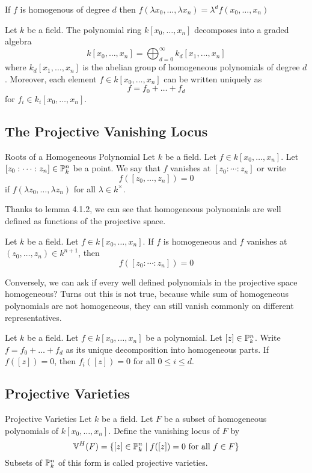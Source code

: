 \documentclass[a4paper]{article}
\begin{document}
\begin{lmm}{}{} If $f$ is homogenous of degree $d$ then $f(\lambda x_0,\dots,\lambda x_n)=\lambda^df(x_0,\dots,x_n)$
\end{lmm}

\begin{prp}{}{} Let $k$ be a field. The polynomial ring $k[x_0,\dots,x_n]$ decomposes into a graded algebra $$k[x_0,\dots,x_n]=\bigoplus_{d=0}^\infty k_d[x_1,\dots,x_n]$$ where $k_d[x_1,\dots,x_n]$ is the abelian group of homogeneous polynomials of degree $d$. Moreover, each element $f\in k[x_0,\dots,x_n]$ can be written uniquely as $$f=f_0+\dots+f_d$$ for $f_i\in k_i[x_0,\dots,x_n]$. 
\end{prp}

\subsection{The Projective Vanishing Locus}
\begin{defn}{Roots of a Homogeneous Polynomial}{} Let $k$ be a field. Let $f\in k[x_0,\dots,x_n]$. Let $[z_0:\cdots:z_n]\in\mathbb{P}_k^n$ be a point. We say that $f$ vanishes at $[z_0:\cdots:z_n]$ or write $$f([z_0,\dots,z_n])=0$$ if $f(\lambda z_0,\dots,\lambda z_n)$ for all $\lambda\in k^\times$. 
\end{defn}

Thanks to lemma 4.1.2, we can see that homogeneous polynomials are well defined as functions of the projective space. 

\begin{lmm}{}{} Let $k$ be a field. Let $f\in k[x_0,\dots,x_n]$. If $f$ is homogeneous and $f$ vanishes at $(z_0,\dots,z_n)\in k^{n+1}$, then $$f([z_0:\cdots:z_n])=0$$
\end{lmm}

Conversely, we can ask if every well defined polynomials in the projective space homogeneous? Turns out this is not true, because while sum of homogeneous polynomials are not homogeneous, they can still vanish commonly on different representatives. 

\begin{lmm}{}{} Let $k$ be a field. Let $f\in k[x_0,\dots,x_n]$ be a polynomial. Let $[z]\in\mathbb{P}_k^n$. Write $f=f_0+\dots+f_d$ as its unique decomposition into homogeneous parts. If $f([z])=0$, then $f_i([z])=0$ for all $0\leq i\leq d$. 
\end{lmm}

\subsection{Projective Varieties}
\begin{defn}{Projective Varieties}{} Let $k$ be a field. Let $F$ be a subset of homogeneous polynomials of $k[x_0,\dots,x_n]$. Define the vanishing locus of $F$ by $$\mathbb{V}^H(F)=\{[z]\in\mathbb{P}_k^n\;|\;f([z])=0\text{ for all }f\in F\}$$ Subsets of $\mathbb{P}_k^n$ of this form is called projective varieties. 
\end{defn}
\end{document}
